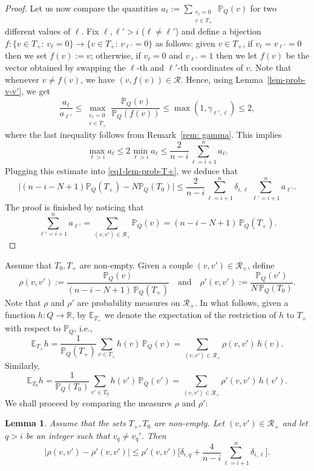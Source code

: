\documentclass[12pt]{article}
\newtheorem{lemma}[theorem]{Lemma}
\theoremstyle{definition}
\theoremstyle{plain}
\newcommand{\E}{\mathbb{E}}
\newcommand{\R}{\mathbb{R}}
\def\Prob{{\mathbb P}}
\def\relation{{\mathcal R}}
\begin{document}
\begin{proof}
Let us now compare the quantities $a_\ell:=\sum_{\substack{v_\ell=0\\v\in T_+}} \, \Prob_Q(v)$ for two different values of $\ell$. 
Fix $\ell, \ell'>i$ ($\ell\neq \ell'$)
and define a bijection $f: \{v\in T_+:\, v_\ell=0\}\to \{v\in T_+:\, v_{\ell'}=0\}$ as follows:
given $v\in T_+$, if $v_\ell=v_{\ell'}=0$ 
then we set $f(v):=v$; otherwise, if $v_{\ell}=0$ and $v_{\ell'}=1$ then
we let $f(v)$ be the vector obtained by swapping the $\ell$-th and $\ell'$-th coordinates of $v$. 
Note that whenever $v\neq f(v)$, we have $(v,f(v))\in \relation$. Hence, using Lemma~\ref{lem-prob-v-v'}, we get
$$
\frac{a_\ell}{a_{\ell'}}\leq \max_{\substack{v_\ell=0\\v\in T_+}} \frac{\Prob_Q(v)}{\Prob_Q(f(v))} 
\leq \max(1,\gamma_{\ell',\ell})\leq 2,$$
where the last inequality follows from Remark~\ref{rem: gamma}.
This implies 
$$
\max_{\ell >i} a_\ell\leq 2\min_{\ell >i} a_\ell \leq \frac{2}{n-i} \sum_{\ell=i+1}^n a_\ell.
$$
Plugging this estimate into \eqref{eq1-lem-prob-T+}, we deduce that 
$$
\big\vert (n-i-N+1)\Prob_Q(T_+)-N\Prob_Q(T_0)\big\vert 
\leq \frac{2}{n-i} \sum_{\ell=i+1}^n \delta_{i,\ell}\,\sum_{\ell'=i+1}^n a_{\ell'}.
$$
The proof is finished by noticing that 
$$
\sum_{\ell'=i+1}^n a_{\ell'}
= \sum_{(v,v')\in \relation_+}\Prob_Q(v)= (n-i-N+1)\, \Prob_Q(T_+).
$$
\end{proof}

\bigskip

Assume that $T_0,T_+$ are non-empty. Given a couple $(v,v')\in \relation_+$, define 
$$
\rho(v,v'):=\frac{\Prob_Q(v)}{(n-i-N+1)\, \Prob_Q(T_+)}\quad \text{and} \quad \rho'(v,v'):=\frac{\Prob_Q(v')}{N\, \Prob_Q(T_0)}.
$$
Note that $\rho$ and $\rho'$ are probability measures on $\relation_+$. 
In what follows, given a function $h:Q\to\R$,
by $\E_{T_+}$ we denote the expectation of the restriction of $h$ to $T_+$ with respect to $\Prob_Q$, i.e., 
$$
\E_{T_+} h= \frac{1}{\Prob_Q(T_+)}\sum_{v\in T_+} h(v)\,\Prob_Q(v)= \sum_{(v,v')\in \relation_+} \rho(v,v')\, h(v).
$$
Similarly,
$$
\E_{T_0} h=\frac{1}{\Prob_Q(T_0)}\sum_{v'\in T_0} h(v')\,\Prob_Q(v')= \sum_{(v,v')\in \relation_+} \rho'(v,v')\, h(v').
$$
We shall proceed by comparing the measures $\rho$ and $\rho'$:
\begin{lemma}\label{lem-estimate-rho}
Assume that the sets $T_+,T_0$ are non-empty.
Let $(v,v')\in \relation_+$ and let  $q>i$ be an integer such that $v_q\neq v_q'$. 
Then 
$$
\vert \rho(v,v')-\rho'(v,v')\vert \leq \rho'(v,v') \Big[\delta_{i,q}+\frac{4}{n-i} \sum_{\ell=i+1}^n \delta_{i,\ell}\Big].
$$
\end{lemma}
\end{document}
